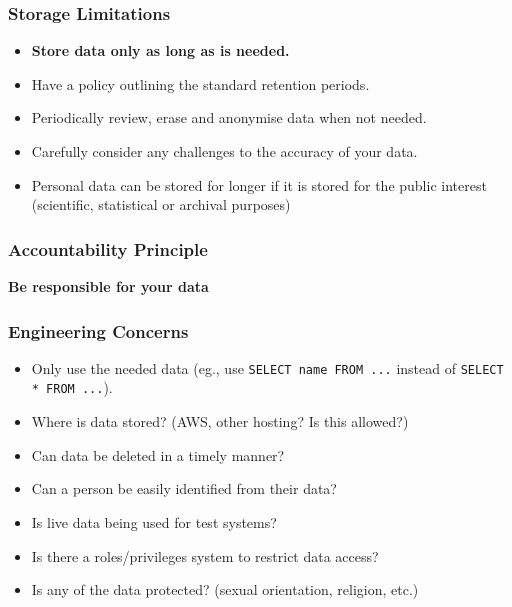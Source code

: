 \subsubsection{Storage Limitations}\label{ssub:storage_limitations}

\begin{itemize}
	\item \textbf{Store data only as long as is needed.}
	\item Have a policy outlining the standard retention periods.
	\item Periodically review, erase and anonymise data when not needed.
	\item Carefully consider any challenges to the accuracy of your data.
	\item Personal data can be stored for longer if it is stored for the public interest (scientific, statistical or archival purposes)
\end{itemize}

\subsubsection{Accountability Principle}\label{ssub:accountability_principle}

\textbf{Be responsible for your data}

\subsubsection{Engineering Concerns}\label{ssub:engineering_concerns}
\begin{itemize}
	\item Only use the needed data (eg., use \texttt{SELECT name FROM ...} instead of \texttt{SELECT * FROM ...}).
	\item Where is data stored? (AWS, other hosting? Is this allowed?)
	\item Can data be deleted in a timely manner?
	\item Can a person be easily identified from their data?
	\item Is live data being used for test systems?
	\item Is there a roles/privileges system to restrict data access?
	\item Is any of the data protected? (sexual orientation, religion, etc.)
\end{itemize}

